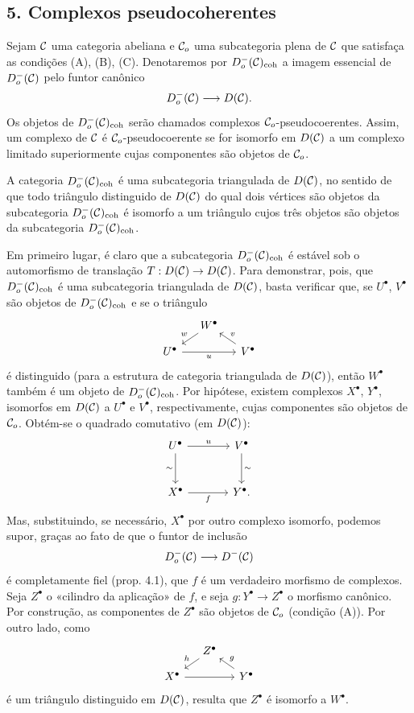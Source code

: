 \subsection*{5. Complexos pseudocoherentes}

Sejam $\mathcal C$ uma categoria abeliana e $\mathcal C_o$ uma subcategoria plena de $\mathcal C$ que satisfaça as condições (A), (B), (C). Denotaremos por $D_o^-(\mathcal C)_{\mathrm{coh}}$ a imagem essencial de $D_o^-(\mathcal C)$ pelo funtor canônico
\[
D_o^-(\mathcal C)\longrightarrow D(\mathcal C).
\]
Os objetos de $D_o^-(\mathcal C)_{\mathrm{coh}}$ serão chamados complexos $\mathcal C_o$-pseudocoerentes. Assim, um complexo de $\mathcal C$ é $\mathcal C_o$-pseudocoerente se for isomorfo em $D(\mathcal C)$ a um complexo limitado superiormente cujas componentes são objetos de $\mathcal C_o$.

A categoria $D_o^-(\mathcal C)_{\mathrm{coh}}$ é uma subcategoria triangulada de $D(\mathcal C)$, no sentido de que todo triângulo distinguido de $D(\mathcal C)$ do qual dois vértices são objetos da subcategoria $D_o^-(\mathcal C)_{\mathrm{coh}}$ é isomorfo a um triângulo cujos três objetos são objetos da subcategoria $D_o^-(\mathcal C)_{\mathrm{coh}}$.

Em primeiro lugar, é claro que a subcategoria $D_o^-(\mathcal C)_{\mathrm{coh}}$ é estável sob o automorfismo de translação $T:D(\mathcal C)\to D(\mathcal C)$. Para demonstrar, pois, que $D_o^-(\mathcal C)_{\mathrm{coh}}$ é uma subcategoria triangulada de $D(\mathcal C)$, basta verificar que, se $U^\bullet$, $V^\bullet$ são objetos de $D_o^-(\mathcal C)_{\mathrm{coh}}$ e se o triângulo
\[
\begin{tikzcd}[column sep=small,row sep=small]
& W^\bullet \arrow[dl,"w"']\\
U^\bullet \arrow[rr,"u"']&& V^\bullet \arrow[ul,"v"']
\end{tikzcd}
\]
é distinguido (para a estrutura de categoria triangulada de $D(\mathcal C)$), então $W^\bullet$ também é um objeto de $D_o^-(\mathcal C)_{\mathrm{coh}}$. Por hipótese, existem complexos $X^\bullet$, $Y^\bullet$, isomorfos em $D(\mathcal C)$ a $U^\bullet$ e $V^\bullet$, respectivamente, cujas componentes são objetos de $\mathcal C_o$. Obtém-se o quadrado comutativo (em $D(\mathcal C)$):
\[
\begin{tikzcd}[column sep=large,row sep=large]
U^\bullet \arrow[r,"u"] \arrow[d,"\sim"']&V^\bullet \arrow[d,"\sim"]\\
X^\bullet \arrow[r,"f"']&Y^\bullet .
\end{tikzcd}
\]
Mas, substituindo, se necessário, $X^\bullet$ por outro complexo isomorfo, podemos supor, graças ao fato de que o funtor de inclusão
\[
D_o^-(\mathcal C)\longrightarrow D^-(\mathcal C)
\]
é completamente fiel (prop. 4.1), que $f$ é um verdadeiro morfismo de complexos. Seja $Z^\bullet$ o «cilindro da aplicação» de $f$, e seja $g:Y^\bullet\to Z^\bullet$ o morfismo canônico. Por construção, as componentes de $Z^\bullet$ são objetos de $\mathcal C_o$ (condição (A)). Por outro lado, como
\[
\begin{tikzcd}[column sep=small,row sep=small]
&Z^\bullet \arrow[dl,"h"']\\
X^\bullet \arrow[rr]&&Y^\bullet \arrow[ul,"g"']
\end{tikzcd}
\]
é um triângulo distinguido em $D(\mathcal C)$, resulta que $Z^\bullet$ é isomorfo a $W^\bullet$.

